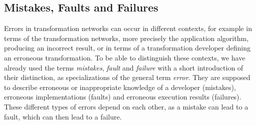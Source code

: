 \subsection{Mistakes, Faults and Failures}

Errors in transformation networks can occur in different contexts, for example in terms of the transformation networks, more precisely the application algorithm, producing an incorrect result, or in terms of a transformation developer defining an erroneous transformation.
To be able to distinguish these contexts, we have already used the terms \emph{mistakes}, \emph{fault} and \emph{failure} with a short introduction of their distinction, as specializations of the general term \emph{error}.
They are supposed to describe erroneous or inappropriate knowledge of a developer (mistakes), erroneous implementations (faults) and erroneous execution results (failures).
These different types of errors depend on each other, as a mistake can lead to a fault, which can then lead to a failure.

